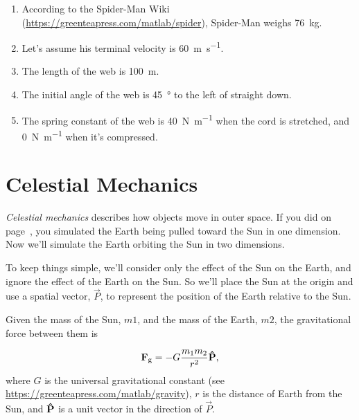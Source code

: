 \begin{enumerate}

\item According to the Spider-Man Wiki (\url{https://greenteapress.com/matlab/spider}), Spider-Man weighs \SI{76}{\kg}.

\item
  Let's assume his terminal velocity is \SI{60}{\meter\per\second}.


\item
  The length of the web is \SI{100}{\meter}.

\item
  The initial angle of the web is \SI{45}{\degree} to the left of straight
  down.

\item
  The spring constant of the web is \SI{40}{\newton\per\meter} when the cord is stretched, and \SI{0}{\newton\per\meter} when it's compressed.
  

\end{enumerate}


\section{Celestial Mechanics}


\emph{Celestial mechanics} describes how objects move in outer space.
If you did  on page~\pageref{earth}, you simulated the Earth being pulled toward the Sun in one dimension.  Now we'll simulate the Earth orbiting the Sun in two dimensions.


To keep things simple, we'll consider only the effect of the Sun on the Earth, and ignore the effect of the Earth on the Sun.  So we'll place the Sun at the origin and use a spatial vector, $\vec{P}$, to represent the position of the Earth relative to the Sun.


Given the mass of the Sun, $m1$, and the mass of the Earth, $m2$, the gravitational force between them is

\begin{equation*}
\vec{F}_\mathrm{g} = -G \frac{m_1 m_2}{r^2} \uvec{P} ,
\end{equation*}
where $G$ is the universal gravitational constant (see \url{https://greenteapress.com/matlab/gravity}),
$r$ is the distance of Earth from the Sun, and
$\uvec{P}$ is a unit vector in the direction of $\vec{P}$.

